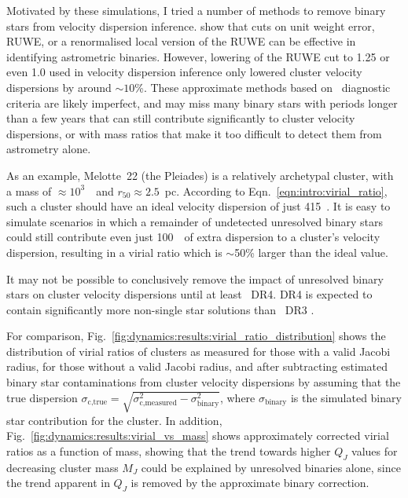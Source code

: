 Motivated by these simulations, I tried a number of methods to remove binary stars from velocity dispersion inference. \cite{penoyre_astrometric_2022,penoyre_astrometric_2022-1} show that cuts on unit weight error, RUWE, or a renormalised local version of the RUWE can be effective in identifying astrometric binaries. However, lowering of the RUWE cut to 1.25 or even 1.0 used in velocity dispersion inference only lowered cluster velocity dispersions by around $\sim10$\%. These approximate methods based on \gaia\ diagnostic criteria are likely imperfect, and may miss many binary stars with periods longer than a few years that can still contribute significantly to cluster velocity dispersions, or with mass ratios that make it too difficult to detect them from astrometry alone.

As an example, Melotte~22 (the Pleiades) is a relatively archetypal cluster, with a mass of $\approx10^3$~\MSun\ and $r_{50}\approx 2.5$~pc. According to Eqn.~\ref{eqn:intro:virial_ratio}, such a cluster should have an ideal velocity dispersion of just 415~\ms. It is easy to simulate scenarios in which a remainder of undetected unresolved binary stars could still contribute even just 100~\ms\ of extra dispersion to a cluster's velocity dispersion, resulting in a virial ratio which is $\sim$50\% larger than the ideal value.

It may not be possible to conclusively remove the impact of unresolved binary stars on cluster velocity dispersions until at least \gaia\ DR4. DR4 is expected to contain significantly more non-single star solutions than \gaia\ DR3 \citep{gaia_collaboration_gaia_2022}.

For comparison, Fig.~\ref{fig:dynamics:results:virial_ratio_distribution} shows the distribution of virial ratios of clusters as measured for those with a valid Jacobi radius, for those without a valid Jacobi radius, and after subtracting estimated binary star contaminations from cluster velocity dispersions by assuming that the true dispersion $\sigma_\text{c,true}=\sqrt{\sigma_\text{c,measured}^2 - \sigma_\text{binary}^2}$, where $\sigma_\text{binary}$ is the simulated binary star contribution for the cluster. In addition, Fig.~\ref{fig:dynamics:results:virial_vs_mass} shows approximately corrected virial ratios as a function of mass, showing that the trend towards higher $Q_J$ values for decreasing cluster mass $M_J$ could be explained by unresolved binaries alone, since the trend apparent in $Q_J$ is removed by the approximate binary correction.

